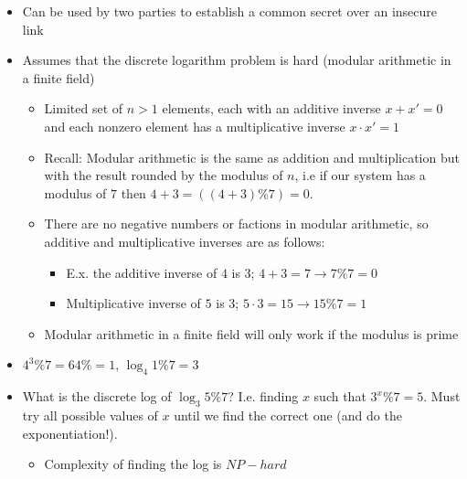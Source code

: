 \documentclass[../notes.tex]{subfiles}
\begin{document}
\begin{itemize}
    \item Can be used by two parties to establish a common secret over an insecure link
    \item Assumes that the discrete logarithm problem is hard (modular arithmetic in a finite field)
        \begin{itemize}
            \item Limited set of $ n>1 $ elements, each with an additive inverse $ x + x' = 0 $ and each nonzero element has a multiplicative inverse $ x \cdot  x' = 1$
            \item Recall: Modular arithmetic is the same as addition and multiplication but with the result rounded by the modulus of $ n $, i.e if our system has a modulus of $  7 $ then $ 4+3 = ((4+3)\%7) = 0$.
            \item There are no negative numbers or factions in modular arithmetic, so additive and multiplicative inverses are as follows:
                \begin{itemize}
                    \item E.x. the additive inverse of $ 4 $ is $ 3 $; $ 4 + 3 = 7 \rightarrow 7 \% 7 = 0 $
                    \item Multiplicative inverse of $ 5 $ is $ 3 $; $ 5 \cdot 3 = 15 \rightarrow 15 \% 7 =  1 $
                \end{itemize}
            \item Modular arithmetic in a finite field will only work if the modulus is prime
        \end{itemize}
    \item  $ 4^3 \% 7 = 64 \% = 1 $, $ \log_4 1 \% 7 = 3 $
    \item What is the discrete log of $ \log_3 5 \% 7 $? I.e. finding $ x $ such that $ 3^x \% 7 = 5 $. Must try all possible values of $ x $ until we find the correct one (and do the exponentiation!).
        \begin{itemize}
            \item Complexity of finding the log is $ NP-hard $
        \end{itemize}
\end{itemize}
\end{document}
